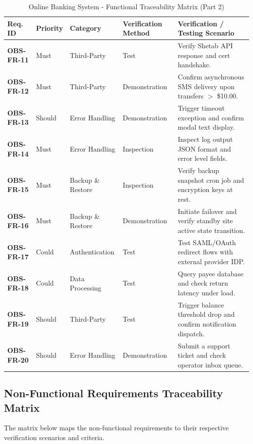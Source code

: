 \documentclass[11pt,a4paper]{article}
\begin{document}
\begin{table}[H]
\centering
\caption{Online Banking System - Functional Traceability Matrix (Part 2)}
\label{tab:functional_rtm_2}
\footnotesize
\singlespacing
\begin{tabular}{p{2.0cm} p{1.4cm} p{2.6cm} p{2.6cm} p{4.8cm}}
\toprule
\textbf{Req. ID} & \textbf{Priority} & \textbf{Category} & \textbf{Verification Method} & \textbf{Verification / Testing Scenario} \\ \midrule
\textbf{OBS-FR-11} & Must & Third-Party & Test & Verify Shetab API response and cert handshake. \\ \midrule
\textbf{OBS-FR-12} & Must & Third-Party & Demonstration & Confirm asynchronous SMS delivery upon transfers $>$ \$10.00. \\ \midrule
\textbf{OBS-FR-13} & Should & Error Handling & Demonstration & Trigger timeout exception and confirm modal text display. \\ \midrule
\textbf{OBS-FR-14} & Must & Error Handling & Inspection & Inspect log output JSON format and error level fields. \\ \midrule
\textbf{OBS-FR-15} & Must & Backup \& Restore & Inspection & Verify backup snapshot cron job and encryption keys at rest. \\ \midrule
\textbf{OBS-FR-16} & Must & Backup \& Restore & Demonstration & Initiate failover and verify standby site active state transition. \\ \midrule
\textbf{OBS-FR-17} & Could & Authentication & Test & Test SAML/OAuth redirect flows with external provider IDP. \\ \midrule
\textbf{OBS-FR-18} & Could & Data Processing & Test & Query payee database and check return latency under load. \\ \midrule
\textbf{OBS-FR-19} & Should & Third-Party & Test & Trigger balance threshold drop and confirm notification dispatch. \\ \midrule
\textbf{OBS-FR-20} & Should & Error Handling & Demonstration & Submit a support ticket and check operator inbox queue. \\ \bottomrule
\end{tabular}
\end{table}

\newpage

\subsection{Non-Functional Requirements Traceability Matrix}
The matrix below maps the non-functional requirements to their respective verification scenarios and criteria.
\end{document}

